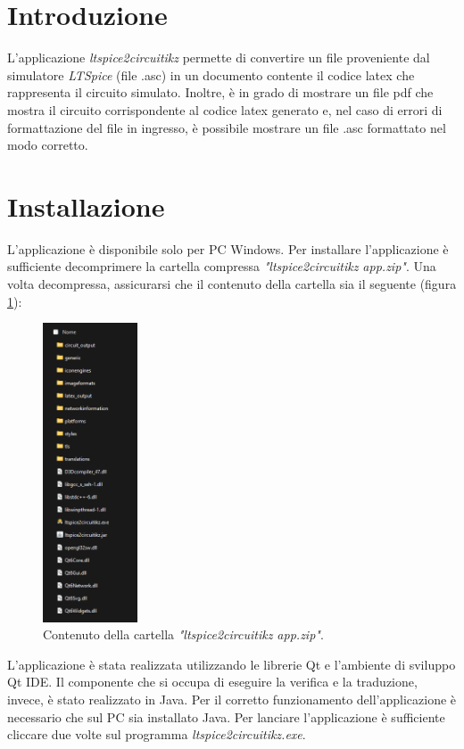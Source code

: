 \section{Introduzione}

L'applicazione \textit{ltspice2circuitikz} permette di convertire un file proveniente dal simulatore \textit{LTSpice} (file .asc) in un documento contente il codice latex che rappresenta il circuito simulato. Inoltre, è in grado di mostrare un file pdf che mostra il circuito corrispondente al codice latex generato e, nel caso di errori di formattazione del file in ingresso, è possibile mostrare un file .asc formattato nel modo corretto. 

\section{Installazione}
L'applicazione è disponibile solo per PC Windows. Per installare l'applicazione è sufficiente decomprimere la cartella compressa \textit{"ltspice2circuitikz app.zip"}. Una volta decompressa, assicurarsi che il contenuto della cartella sia il seguente (figura \ref{fig:contenuto}):

\begin{figure}[h!]
	\centering
	\includegraphics[width=0.25\textwidth]{./ImageFiles/contenuto.png}
	\caption{Contenuto della cartella \textit{"ltspice2circuitikz app.zip"}.}
	\label{fig:contenuto}
\end{figure}

L'applicazione è stata realizzata utilizzando le librerie Qt e l'ambiente di sviluppo Qt IDE. Il componente che si occupa di eseguire la verifica e la traduzione, invece, è stato realizzato in Java. Per il corretto funzionamento dell'applicazione è necessario che sul PC sia installato Java. Per lanciare l'applicazione è sufficiente cliccare due volte sul programma \textit{ltspice2circuitikz.exe}.


